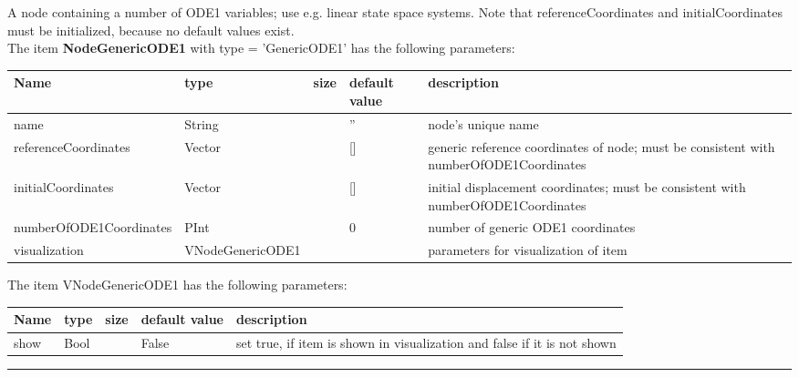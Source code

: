 %
\newpage

\label{sec:item:NodeGenericODE1}
A node containing a number of ODE1 variables; use e.g. linear state space systems. Note that referenceCoordinates and initialCoordinates must be initialized, because no default values exist.\vspace{12pt}
 \\\vspace{12pt} \noindent The item {\bf NodeGenericODE1} with type = 'GenericODE1' has the following parameters:\vspace{-1cm}\\ 
\begin{center}
  \footnotesize
  \begin{longtable}{| p{4.5cm} | p{2.5cm} | p{0.5cm} | p{2.5cm} | p{6cm} |}
    \hline
    \bf Name & \bf type & \bf size & \bf default value & \bf description \\ \hline
    name &     String &      &     '' &     node's unique name\\ \hline
    referenceCoordinates &     Vector &      &     [] &     generic reference coordinates of node; must be consistent with numberOfODE1Coordinates\\ \hline
    initialCoordinates &     Vector &      &     [] &     initial displacement coordinates; must be consistent with numberOfODE1Coordinates\\ \hline
    numberOfODE1Coordinates &     PInt &      &     0 &     number of generic ODE1 coordinates\\ \hline
    visualization & VNodeGenericODE1 & & & parameters for visualization of item \\ \hline
	  \end{longtable}
	\end{center}
The item VNodeGenericODE1 has the following parameters:\vspace{-1cm}\\ 
\begin{center}
  \footnotesize
  \begin{longtable}{| p{4.5cm} | p{2.5cm} | p{0.5cm} | p{2.5cm} | p{6cm} |}
    \hline
    \bf Name & \bf type & \bf size & \bf default value & \bf description \\ \hline
    show &     Bool &      &     False &     set true, if item is shown in visualization and false if it is not shown\\ \hline
	  \end{longtable}
	\end{center}
\par\noindent\rule{\textwidth}{0.4pt}
\label{description_NodeGenericODE1}
